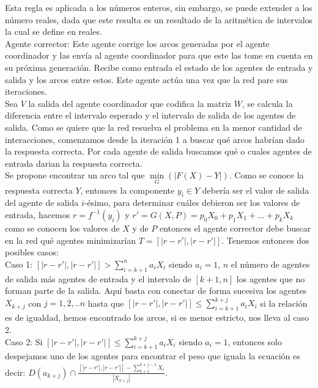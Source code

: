 \documentclass{article}
\begin{document}
            Esta regla es aplicada a los números enteros, sin embargo, se puede extender a los número reales, dada que este resulta es un resultado de la aritmética de intervalos la cual se define en reales.\\

        Agente corrector: Este agente corrige los arcos generadas por el agente coordinador y las envía al agente coordinador para que este las tome en cuenta en su próxima generación. Recibe como entrada el estado de los agentes de entrada y salida y los arcos entre estos. Este agente actúa una vez que la red pare sus iteraciones. \\

        Sea $V$ la salida del agente coordinador que codifica la matriz $W$, se calcula la diferencia entre el intervalo esperado y el intervalo de salida de los agentes de salida.
        Como se quiere que la red resuelva el problema en la menor cantidad de interacciones, comenzamos desde la iteración 1 a buscar qué arcos habrían dado la
        respuesta correcta. Por cada agente de salida buscamos qué o cuales agentes de entrada darian la respuesta correcta.  \\

        Se propone encontrar un arco tal que $\underset{G}{\min}(|F(X)-Y|)$. Como se conoce la respuesta correcta $Y$, entonces la componente $y_i \in Y$ debería ser el valor de salida del agente de salida $i$-ésimo, para determinar cuáles debieron ser los valores de entrada, hacemos $r=f^{-1}(y_i)$ y $r'=G(X,P)=p_0X_0 + p_1X_1 +...+p_kX_k$ como se conocen los valores de $X$ y de $P$
        entonces el agente corrector debe buscar en la red qué agentes minimizarían $T=[|r-r'|,|r-r'|]$. Tenemos entonces dos posibles casos: \\

        Caso 1: $[|r-r'|,|r-r'|] > \sum_{i=k+1}^{n} a_iX_i$ siendo $a_i=1$, $n$ el número de agentes de salida más agentes de entrada y el intervalo de $[k+1,n]$ los agentes
        que no forman parte de la salida. Aquí basta con conectar de forma sucesiva los agentes $X_{k+j}$ con $j=1,2,..n$ hasta que $[|r-r'|,|r-r'|] \leqslant \sum_{i=k+1}^{k+j} a_iX_i$ si la relación es de igualdad, hemos encontrado los arcos,
         si es menor estricto, nos lleva al caso 2.\\

        Caso 2: Si $[|r-r'|,|r-r'|] \leqslant \sum_{i=k+1}^{k+j} a_iX_i$ siendo $a_i=1$, entonces solo despejamos uno de los agentes para encontrar el peso que iguala la ecuación
        es decir: $D(a_{k+j}) \cap \frac{[|r-r'|,|r-r'|] - \sum_{k+1}^{k+j-1} X_i}{|X_{k+j}|}$.\\
\end{document}
